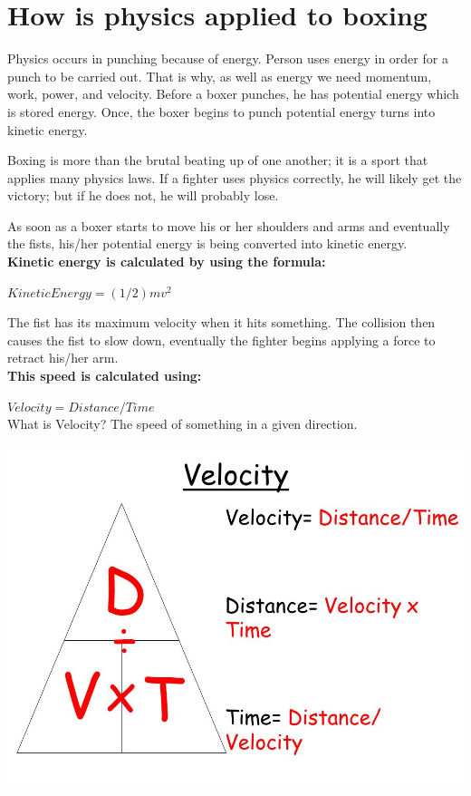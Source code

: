 \documentclass[conference,compsoc]{IEEEtran}
\begin{document}
\section*{How is physics applied to boxing}
Physics occurs in punching because of energy. Person uses energy in order for a punch to be carried out. That is why, as well as energy we need momentum, work, power, and velocity. Before a boxer punches, he has potential energy which is stored energy. Once, the boxer begins to punch potential energy turns into kinetic energy.

Boxing is more than the brutal beating up of one another; it is a sport that applies many physics laws. If a fighter uses physics correctly, he will likely get the victory; but if he does not, he will probably lose.

As soon as a boxer starts to move his or her shoulders and arms and eventually the fists, his/her potential energy is being converted into kinetic energy.\\
\textbf{Kinetic energy is calculated by using the formula:}

$Kinetic Energy = (1/2)mv^2$

The fist has its maximum velocity when it hits something. The collision then causes the fist to slow down, eventually the fighter begins applying a force to retract his/her arm.\\
\textbf{This speed is calculated using:}

$Velocity = Distance / Time$
\\
What is Velocity? The speed of something in a given direction.

\includegraphics[scale=.3]{Velocity.jpeg}




\end{document}
